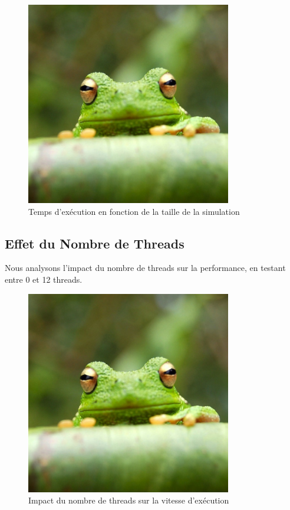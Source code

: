 \documentclass{article}
\begin{document}
\begin{figure}[h]
    \centering
    \includegraphics[width=0.8\textwidth]{frog.jpg}  %
    \caption{Temps d'exécution en fonction de la taille de la simulation}
    \label{fig:taille_simulation}
\end{figure}

\subsection{Effet du Nombre de Threads}
Nous analysons l'impact du nombre de threads sur la performance, en testant entre 0 et 12 threads.

\begin{figure}[h]
    \centering
    \includegraphics[width=0.8\textwidth]{frog.jpg}  %
    \caption{Impact du nombre de threads sur la vitesse d'exécution}
    \label{fig:nb_threads}
\end{figure}
\end{document}
